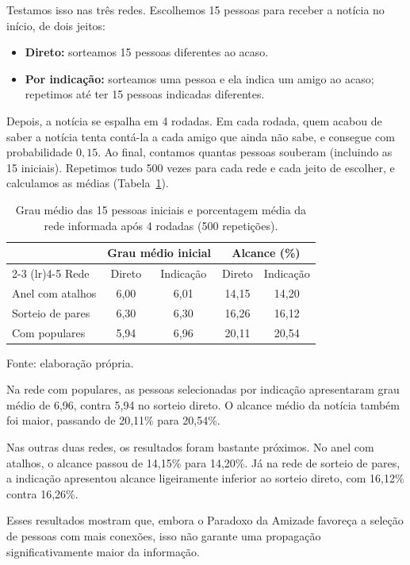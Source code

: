 \documentclass[12pt,a4paper]{article}
\theoremstyle{plain}
\theoremstyle{definition}
\theoremstyle{remark}
\begin{document}
Testamos isso nas três redes. Escolhemos 15 pessoas para receber a
notícia no início, de dois jeitos:
\begin{itemize}
  \item \textbf{Direto:} sorteamos 15 pessoas diferentes ao acaso.
  \item \textbf{Por indicação:} sorteamos uma pessoa e ela indica um
        amigo ao acaso; repetimos até ter 15 pessoas indicadas
        diferentes.
\end{itemize}
Depois, a notícia se espalha em 4 rodadas. Em cada rodada, quem acabou
de saber a notícia tenta contá-la a cada amigo que ainda não sabe, e
consegue com probabilidade $0{,}15$. Ao final, contamos quantas pessoas
souberam (incluindo as 15 iniciais). Repetimos tudo 500 vezes para cada
rede e cada jeito de escolher, e calculamos as médias
(Tabela~\ref{tab:noticia}).


\begin{table}[htbp]
\centering
\caption{Grau médio das 15 pessoas iniciais e
porcentagem média da rede informada após
4 rodadas (500 repetições).}
\label{tab:noticia}
\begin{tabular}{lcccc}
\toprule
& \multicolumn{2}{c}{Grau médio inicial}
& \multicolumn{2}{c}{Alcance (\%)} \\
\cmidrule(lr){2-3}
\cmidrule(lr){4-5}
Rede & Direto & Indicação & Direto & Indicação \\
\midrule
Anel com atalhos
& 6,00 & 6,01 & 14,15 & 14,20 \\
Sorteio de pares
& 6,30 & 6,30 & 16,26 & 16,12 \\
Com populares
& 5,94 & 6,96 & 20,11 & 20,54 \\
\bottomrule
\end{tabular}

\smallskip
{\footnotesize Fonte: elaboração própria.}
\end{table}


Na rede com populares, as pessoas selecionadas por
indicação apresentaram grau médio de 6,96, contra 5,94
no sorteio direto. O alcance médio da notícia também
foi maior, passando de 20,11\% para 20,54\%.

Nas outras duas redes, os resultados foram bastante
próximos. No anel com atalhos, o alcance passou de
14,15\% para 14,20\%. Já na rede de sorteio de pares,
a indicação apresentou alcance ligeiramente inferior
ao sorteio direto, com 16,12\% contra 16,26\%.

Esses resultados mostram que, embora o Paradoxo da
Amizade favoreça a seleção de pessoas com mais conexões,
isso não garante uma propagação significativamente
maior da informação.
\end{document}
